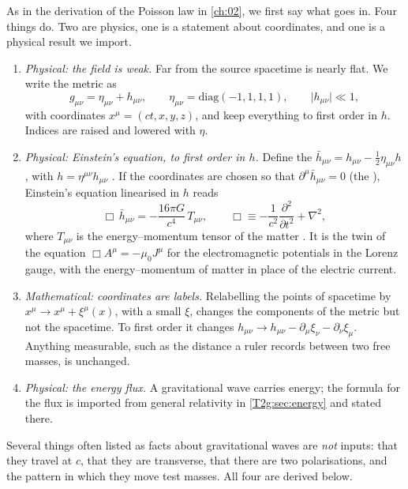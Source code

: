 As in the derivation of the Poisson law in \cref{ch:02}, we first say what goes in. Four things do. Two are physics, one is a statement about coordinates, and one is a physical result we import.
\begin{enumerate}[itemsep=1pt]
  \item \emph{Physical: the field is weak.} Far from the source spacetime is nearly flat. We write the metric as
  \begin{equation}
    g_{\mu\nu}=\eta_{\mu\nu}+h_{\mu\nu},\qquad \eta_{\mu\nu}=\mathrm{diag}(-1,1,1,1),\qquad \lvert h_{\mu\nu}\rvert\ll1,
    \label{T2g:eq:weak}
  \end{equation}
  with coordinates $x^\mu=(ct,x,y,z)$, and keep everything to first order in $h$. Indices are raised and lowered with $\eta$.
  \item \emph{Physical: Einstein's equation, to first order in $h$.} Define the  $\bar h_{\mu\nu}=h_{\mu\nu}-\tfrac12\eta_{\mu\nu}h$, with $h=\eta^{\mu\nu}h_{\mu\nu}$ . If the coordinates are chosen so that $\partial^\mu\bar h_{\mu\nu}=0$ (the ), Einstein's equation linearised in $h$ reads
  \begin{equation}
    \Box\,\bar h_{\mu\nu}=-\frac{16\pi G}{c^4}\,T_{\mu\nu},\qquad
    \Box\equiv-\frac{1}{c^2}\frac{\partial^2}{\partial t^2}+\nabla^2 ,
    \label{T2g:eq:linear-einstein}
  \end{equation}
  where $T_{\mu\nu}$ is the energy--momentum tensor of the matter \cite[Sec.~1.1]{Maggiore2007}. It is the twin of the equation $\Box A^\mu=-\mu_0J^\mu$ for the electromagnetic potentials in the Lorenz gauge, with the energy--momentum of matter in place of the electric current.
  \item \emph{Mathematical: coordinates are labels.} Relabelling the points of spacetime by $x^\mu\to x^\mu+\xi^\mu(x)$, with a small $\xi$, changes the components of the metric but not the spacetime. To first order it changes $h_{\mu\nu}\to h_{\mu\nu}-\partial_\mu\xi_\nu-\partial_\nu\xi_\mu$. Anything measurable, such as the distance a ruler records between two free masses, is unchanged.
  \item \emph{Physical: the energy flux.} A gravitational wave carries energy; the formula for the flux is imported from general relativity in \cref{T2g:sec:energy} and stated there.
\end{enumerate}
Several things often listed as facts about gravitational waves are \emph{not} inputs: that they travel at $c$, that they are transverse, that there are two polarisations, and the pattern in which they move test masses. All four are derived below.

